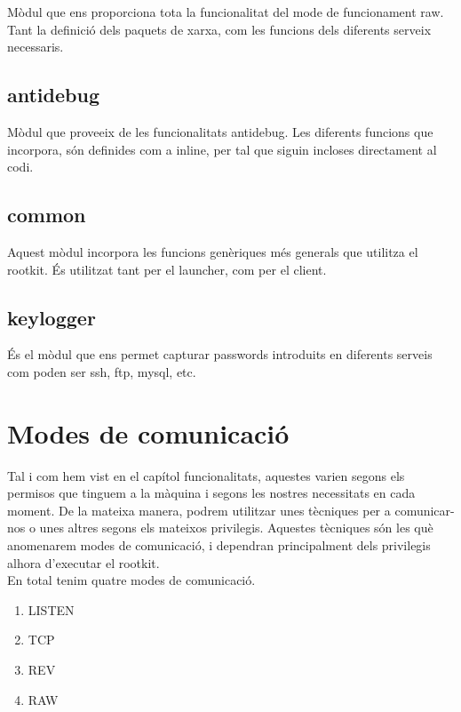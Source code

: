 Mòdul que ens proporciona tota la funcionalitat del mode de funcionament raw. Tant la definició dels
paquets de xarxa, com les funcions dels diferents serveix necessaris.

\subsection{antidebug}

Mòdul que proveeix de les funcionalitats antidebug. Les diferents funcions que incorpora, són definides
com a inline, per tal que siguin incloses directament al codi.

\subsection{common}

Aquest mòdul incorpora les funcions genèriques més generals que utilitza el rootkit. És utilitzat tant per
el launcher, com per el client.

\subsection{keylogger}

És el mòdul que ens permet capturar passwords introduits en diferents serveis com poden ser ssh, ftp, mysql, etc.
\section{Modes de comunicació}

Tal i com hem vist en el capítol funcionalitats, aquestes varien segons els permisos que tinguem a la màquina 
i segons les nostres necessitats en cada moment. De la mateixa manera, podrem utilitzar unes tècniques per a
comunicar-nos o unes altres segons els mateixos privilegis. Aquestes tècniques són les què anomenarem modes
de comunicació, i dependran principalment dels privilegis alhora d'executar el rootkit.\\

En total tenim quatre modes de comunicació. \\

\begin{enumerate}
    \item LISTEN
    \item TCP
    \item REV
    \item RAW
\end{enumerate}

